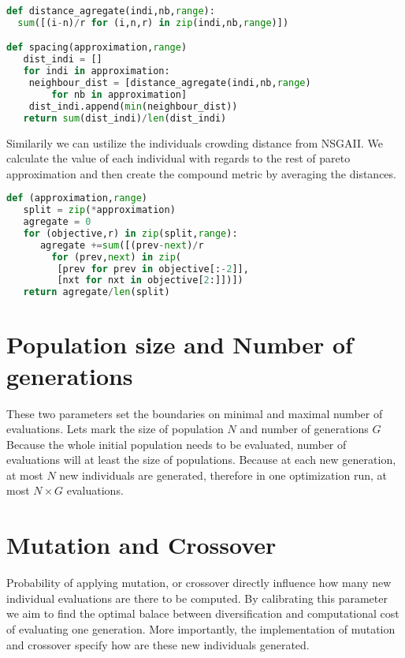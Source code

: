 \documentclass[12pt,oneside]{fithesis2}
\begin{document}
\begin{lstlisting}[language=Python,label=space_example,caption=Spacing indicator implementation]
def distance_agregate(indi,nb,range):
  sum([(i-n)/r for (i,n,r) in zip(indi,nb,range)])

def spacing(approximation,range)
   dist_indi = []
   for indi in approximation:
	neighbour_dist = [distance_agregate(indi,nb,range) 
		for nb in approximation]
	dist_indi.append(min(neighbour_dist))
   return sum(dist_indi)/len(dist_indi)
\end{lstlisting}

Similarily we can ustilize the individuals crowding distance from NSGAII. We calculate the value of each individual with regards to the rest of pareto approximation and then create the compound metric by averaging the distances.

\begin{lstlisting}[language=Python,label=space_example,caption=Spacing indicator implementation]
def (approximation,range)
   split = zip(*approximation)
   agregate = 0
   for (objective,r) in zip(split,range):
      agregate +=sum([(prev-next)/r 
        for (prev,next) in zip(
         [prev for prev in objective[:-2]],
         [nxt for nxt in objective[2:]])])
   return agregate/len(split)
\end{lstlisting}


\section{Population size and Number of generations}
These two parameters set the boundaries on minimal and maximal number of evaluations. Lets mark the size of population $N$ and number of generations $G$ Because the whole initial population needs to be evaluated, number of evaluations will at least the size of populations.
Because at each new generation, at most $N$ new individuals are generated, therefore in one optimization run, at most $N \times G$ evaluations.

\section{Mutation and Crossover}
Probability of applying mutation, or crossover directly influence how many new individual evaluations are there to be computed. By calibrating this parameter we aim to find the optimal balace between diversification and computational cost of evaluating one generation. More importantly, the implementation of mutation and crossover specify how are these new individuals generated. 
\end{document}
